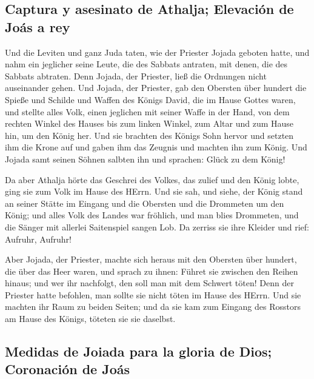\hypertarget{captura-y-asesinato-de-athalja-elevaciuxf3n-de-jouxe1s-a-rey}{%
\subsection{Captura y asesinato de Athalja; Elevación de Joás a
rey}\label{captura-y-asesinato-de-athalja-elevaciuxf3n-de-jouxe1s-a-rey}}

 Und die Leviten und ganz Juda taten, wie der Priester
Jojada geboten hatte, und nahm ein jeglicher seine Leute, die des
Sabbats antraten, mit denen, die des Sabbats abtraten. Denn Jojada, der
Priester, ließ die Ordnungen nicht auseinander gehen.  Und
Jojada, der Priester, gab den Obersten über hundert die Spieße und
Schilde und Waffen des Königs David, die im Hause Gottes waren,
 und stellte alles Volk, einen jeglichen mit seiner Waffe
in der Hand, von dem rechten Winkel des Hauses bis zum linken Winkel,
zum Altar und zum Hause hin, um den König her.  Und sie
brachten des Königs Sohn hervor und setzten ihm die Krone auf und gaben
ihm das Zeugnis und machten ihn zum König. Und Jojada samt seinen Söhnen
salbten ihn und sprachen: Glück zu dem König!

 Da aber Athalja hörte das Geschrei des Volkes, das
zulief und den König lobte, ging sie zum Volk im Hause des HErrn.
 Und sie sah, und siehe, der König stand an seiner Stätte
im Eingang und die Obersten und die Drommeten um den König; und alles
Volk des Landes war fröhlich, und man blies Drommeten, und die Sänger
mit allerlei Saitenspiel sangen Lob. Da zerriss sie ihre Kleider und
rief: Aufruhr, Aufruhr!

 Aber Jojada, der Priester, machte sich heraus mit den
Obersten über hundert, die über das Heer waren, und sprach zu ihnen:
Führet sie zwischen den Reihen hinaus; und wer ihr nachfolgt, den soll
man mit dem Schwert töten! Denn der Priester hatte befohlen, man sollte
sie nicht töten im Hause des HErrn.  Und sie machten ihr
Raum zu beiden Seiten; und da sie kam zum Eingang des Rosstors am Hause
des Königs, töteten sie sie daselbst.

\hypertarget{medidas-de-joiada-para-la-gloria-de-dios-coronaciuxf3n-de-jouxe1s}{%
\subsection{Medidas de Joiada para la gloria de Dios; Coronación de
Joás}\label{medidas-de-joiada-para-la-gloria-de-dios-coronaciuxf3n-de-jouxe1s}}

